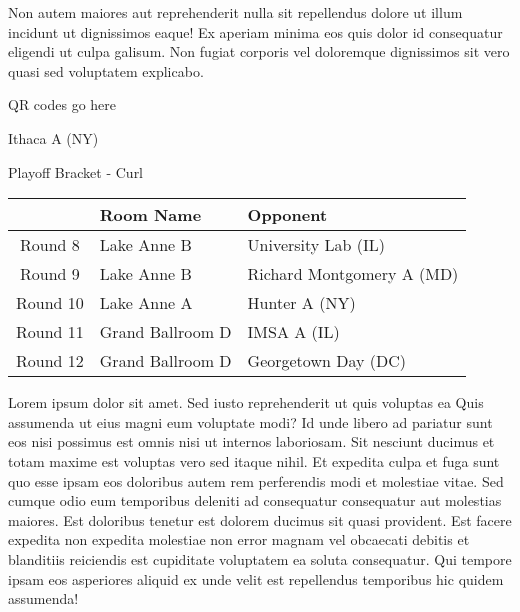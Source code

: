 \documentclass{article}%
\begin{document}
\newline%
Non autem maiores aut reprehenderit nulla sit repellendus dolore ut illum incidunt ut dignissimos eaque! Ex aperiam minima eos quis dolor id consequatur eligendi ut culpa galisum. Non fugiat corporis vel doloremque dignissimos sit vero quasi sed voluptatem explicabo.\newline%
\newline%
%
\vspace*{30pt}%
\begin{center}%
\begin{Huge}%
QR codes go here%
\end{Huge}%
\end{center}%
\newpage%
\begin{center}%
\begin{Huge}%
Ithaca A (NY)%
\end{Huge}%
\vspace*{8pt}%
\linebreak%
\begin{Large}%
Playoff Bracket {-} Curl%
\end{Large}%
\end{center}%
\begin{tabularx}{\textwidth}{|c|Y|Y|}%
\hline%
&Room Name&Opponent\\%
\hline%
Round 8&Lake Anne B&University Lab (IL)\\%
Round 9&Lake Anne B&Richard Montgomery A (MD)\\%
Round 10&Lake Anne A&Hunter A (NY)\\%
Round 11&Grand Ballroom D&IMSA A (IL)\\%
Round 12&Grand Ballroom D&Georgetown Day (DC)\\%
\hline%
\end{tabularx}%
\vspace*{8pt}%
\linebreak%
\newline%
\newline%
Lorem ipsum dolor sit amet. Sed iusto reprehenderit ut quis voluptas ea Quis assumenda ut eius magni eum voluptate modi? Id unde libero ad pariatur sunt eos nisi possimus est omnis nisi ut internos laboriosam. Sit nesciunt ducimus et totam maxime est voluptas vero sed itaque nihil. Et expedita culpa et fuga sunt quo esse ipsam eos doloribus autem rem perferendis modi et molestiae vitae.\newline%
\newline%
Sed cumque odio eum temporibus deleniti ad consequatur consequatur aut molestias maiores. Est doloribus tenetur est dolorem ducimus sit quasi provident. Est facere expedita non expedita molestiae non error magnam vel obcaecati debitis et blanditiis reiciendis est cupiditate voluptatem ea soluta consequatur. Qui tempore ipsam eos asperiores aliquid ex unde velit est repellendus temporibus hic quidem assumenda!\newline%
\end{document}
